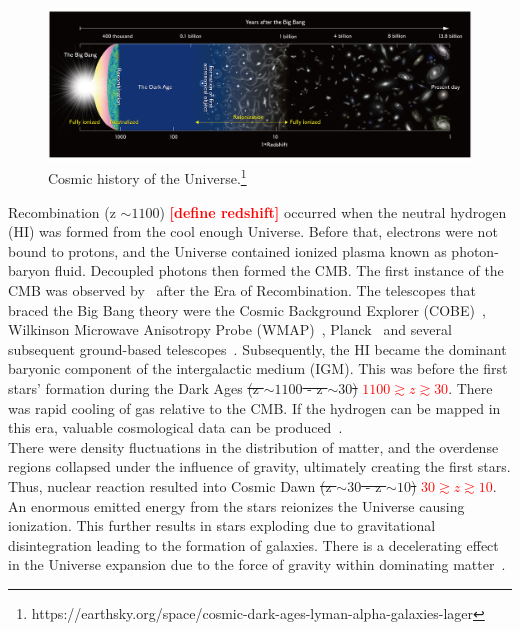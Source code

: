 \documentclass[12pt,a4paper]{report}
\newcommand{\attention}[1]{\textcolor{red}{\bf {#1}}}
\begin{document}
	\begin{figure}[htb!]
		\begin{center}
			\includegraphics[width=\linewidth]{Figures/Reionizationtimeline.jpg}
			\caption{Cosmic history of the Universe.\protect\footnote{https://earthsky.org/space/cosmic-dark-ages-lyman-alpha-galaxies-lager}}
			\label{Fig:timeline}
		\end{center}
	\end{figure}
	
	Recombination (z $\sim1100$) \attention{[define redshift]} occurred when the neutral hydrogen (HI) was formed from the cool enough Universe. Before that, electrons were not bound to protons, and the Universe contained ionized plasma known as photon-baryon fluid. Decoupled photons then formed the CMB. The first instance of the CMB was observed by~\citep{1965ApJ...142..419P} after the Era of Recombination. The telescopes that braced the Big Bang theory were the Cosmic Background Explorer (COBE)~\citep{2004astro.ph..2528M}, Wilkinson Microwave Anisotropy Probe (WMAP)~\citep{2009ApJS..180..306D}, Planck~\citep{2016A&A...594A..16P} and several subsequent ground-based telescopes~\citep{2004astro.ph..2528M}. Subsequently, the HI became the dominant baryonic component of the intergalactic medium (IGM). This was before the first stars' formation during the Dark Ages \st{(z $\sim1100$ - z $\sim30$)} \attention{$1100 \gtrsim z \gtrsim 30$}. There was rapid cooling of gas relative to the CMB. If the hydrogen can be mapped in this era, valuable cosmological data can be produced~\citep{2015Sci...349..849H, 11, 2004PhRvL..92u1301L}.\\
	
	There were density fluctuations in the distribution of matter, and the overdense regions collapsed under the influence of gravity, ultimately creating the first stars. Thus, nuclear reaction resulted into Cosmic Dawn \st{(z $\sim30$ - z $\sim10$)} \attention{$30 \gtrsim z \gtrsim 10$}. An enormous emitted energy from the stars reionizes the Universe causing ionization. This further results in stars exploding due to gravitational disintegration leading to the formation of galaxies. There is a decelerating effect in the Universe expansion due to the force of gravity within dominating matter~\citep{2015Sci...349..849H, 2017arXiv170808521D, 2012AdSpR..49..433B}.\\
	
\end{document}
